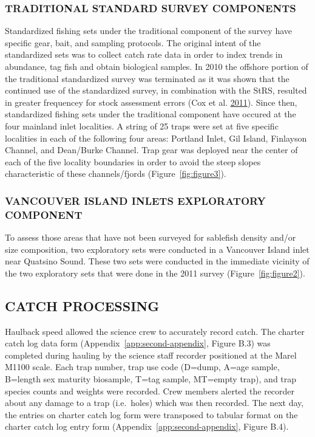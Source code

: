 \documentclass[12pt]{article}\usepackage[]{graphicx}\usepackage[]{color}
\begin{document}
\hypertarget{traditional-standard-survey-components}{%
\subsubsection{TRADITIONAL STANDARD SURVEY COMPONENTS}\label{traditional-standard-survey-components}}

Standardized fishing sets under the traditional component of the survey have specific gear, bait, and sampling protocols. The original intent of the standardized sets was to collect catch rate data in order to index trends in abundance, tag fish and obtain biological samples. In 2010 the offshore portion of the traditional standardized survey was terminated as it was shown that the continued use of the standardized survey, in combination with the StRS, resulted in greater frequencey for stock assessment errors (Cox et al. \protect\hyperlink{ref-Cox2011}{2011}). Since then, standardized fishing sets under the traditional component have occured at the four mainland inlet localities. A string of 25 traps were set at five specific localities in each of the following four areas: Portland Inlet, Gil Island, Finlayson Channel, and Dean/Burke Channel. Trap gear was deployed near the center of each of the five locality boundaries in order to avoid the steep slopes characteristic of these channels/fjords (Figure~\ref{fig:figure3}).

\hypertarget{vancouver-island-inlets-exploratory-component}{%
\subsubsection{VANCOUVER ISLAND INLETS EXPLORATORY COMPONENT}\label{vancouver-island-inlets-exploratory-component}}

To assess those areas that have not been surveyed for sablefish density and/or size composition, two exploratory sets were conducted in a Vancouver Island inlet near Quatsino Sound. These two sets were conducted in the immediate vicinity of the two exploratory sets that were done in the 2011 survey (Figure~\ref{fig:figure2}).

\hypertarget{catch-processing}{%
\subsection{CATCH PROCESSING}\label{catch-processing}}

Haulback speed allowed the science crew to accurately record catch. The charter catch log data form (Appendix~\ref{app:second-appendix}, Figure B.3) was completed during hauling by the science staff recorder positioned at the Marel M1100 scale. Each trap number, trap use code (D=dump, A=age sample, B=length sex maturity biosample, T=tag sample, MT=empty trap), and trap species counts and weights were recorded. Crew members alerted the recorder about any damage to a trap (i.e.~holes) which was then recorded. The next day, the entries on charter catch log form were transposed to tabular format on the charter catch log entry form (Appendix~\ref{app:second-appendix}, Figure B.4).
\end{document}
